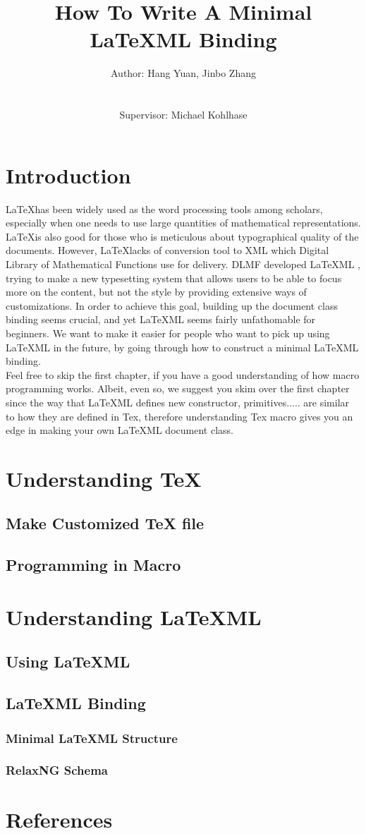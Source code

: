 \documentclass{book}
\title{\textbf{How To Write A Minimal LaTeXML Binding}}
\author{Author: Hang Yuan, Jinbo Zhang \\ \\ \\ Supervisor: Michael Kohlhase}
\begin{document}
\maketitle

\tableofcontents

\chapter{Introduction}
\LaTeX has been widely used as the word processing tools among scholars, especially 
when one needs to use large quantities of mathematical representations. \LaTeX is also 
good for those who is meticulous about typographical quality of the documents.  However,
\LaTeX lacks of conversion tool to XML which Digital Library of Mathematical Functions use
for delivery. DLMF developed \LaTeX ML , trying to make a new typesetting system that allows
users to be able to focus more on the content, but not the style by providing extensive ways of 
customizations. In order to achieve this goal, building up the document class binding seems crucial, 
and yet \LaTeX ML seems fairly unfathomable for beginners. We want to make it easier for people who
want to pick up using \LaTeX ML in the future, by going through how to construct a minimal \LaTeX ML 
binding.  \\

Feel free to skip the first chapter, if you have a good understanding of how macro programming works.
Albeit, even so, we suggest you skim over the first chapter since the way that \LaTeX ML defines 
new constructor, primitives..... are similar to how they are defined in Tex, therefore understanding
Tex macro gives you an edge in making your own \LaTeX ML document class.
  
\chapter{Understanding TeX}
\section{Make Customized TeX file}
\section{Programming in Macro}
\chapter{Understanding LaTeXML} 
\section{Using LaTeXML}
\section{LaTeXML Binding}
\subsection{Minimal LaTeXML Structure}
\subsection{RelaxNG Schema}
\chapter{References}
\end{document}

